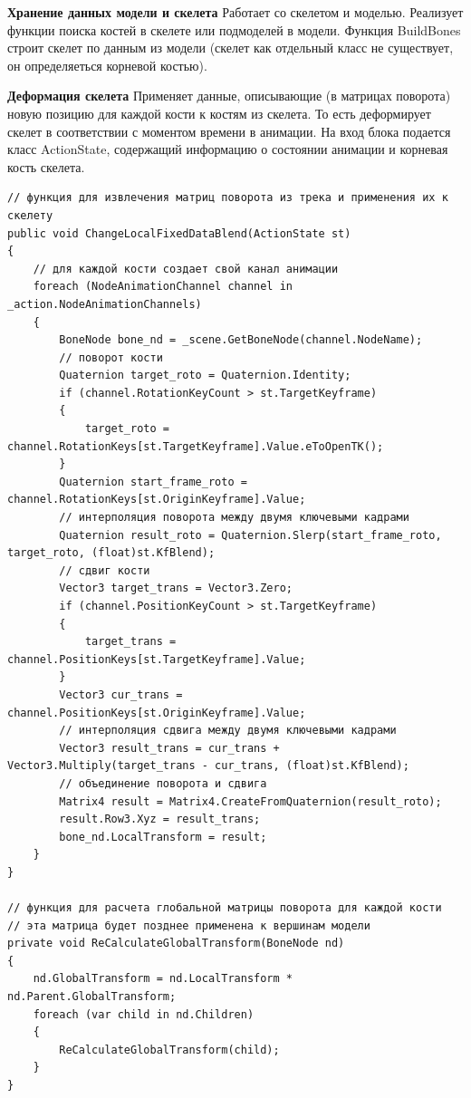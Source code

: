 \textbf{Хранение данных модели и скелета}
Работает со скелетом и моделью.
Реализует функции поиска костей в скелете или подмоделей в модели.
Функция BuildBones строит скелет по данным из модели (скелет как отдельный класс не существует, он определяеться корневой костью).


\textbf{Деформация скелета}
Применяет данные, описывающие (в матрицах поворота) новую позицию для каждой кости к костям из скелета.
То есть деформирует скелет в соответствии с моментом времени в анимации. На вход блока подается класс ActionState, содержащий информацию о состоянии анимации и корневая кость скелета.

\begin{verbatim}
// функция для извлечения матриц поворота из трека и применения их к скелету
public void ChangeLocalFixedDataBlend(ActionState st)
{
    // для каждой кости создает свой канал анимации    
    foreach (NodeAnimationChannel channel in _action.NodeAnimationChannels)
    {
        BoneNode bone_nd = _scene.GetBoneNode(channel.NodeName);
        // поворот кости
        Quaternion target_roto = Quaternion.Identity;
        if (channel.RotationKeyCount > st.TargetKeyframe)
        {
            target_roto = channel.RotationKeys[st.TargetKeyframe].Value.eToOpenTK();
        }
        Quaternion start_frame_roto = channel.RotationKeys[st.OriginKeyframe].Value;
        // интерполяция поворота между двумя ключевыми кадрами
        Quaternion result_roto = Quaternion.Slerp(start_frame_roto, target_roto, (float)st.KfBlend);
        // сдвиг кости
        Vector3 target_trans = Vector3.Zero;
        if (channel.PositionKeyCount > st.TargetKeyframe)
        {
            target_trans = channel.PositionKeys[st.TargetKeyframe].Value;
        }
        Vector3 cur_trans = channel.PositionKeys[st.OriginKeyframe].Value;
        // интерполяция сдвига между двумя ключевыми кадрами
        Vector3 result_trans = cur_trans + Vector3.Multiply(target_trans - cur_trans, (float)st.KfBlend);
        // объединение поворота и сдвига
        Matrix4 result = Matrix4.CreateFromQuaternion(result_roto);
        result.Row3.Xyz = result_trans;
        bone_nd.LocalTransform = result;
    }
}

// функция для расчета глобальной матрицы поворота для каждой кости
// эта матрица будет позднее применена к вершинам модели
private void ReCalculateGlobalTransform(BoneNode nd)
{
    nd.GlobalTransform = nd.LocalTransform * nd.Parent.GlobalTransform;
    foreach (var child in nd.Children)
    {
        ReCalculateGlobalTransform(child);
    }
}
\end{verbatim}




